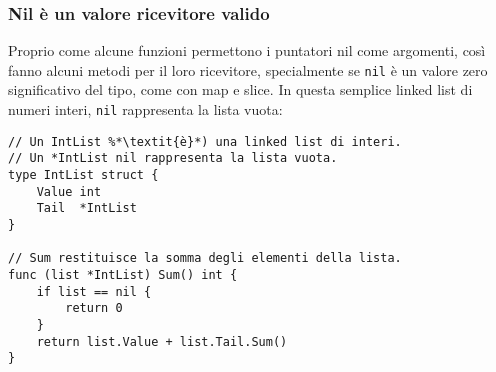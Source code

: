 \documentclass[../../thesis.tex]{subfiles}
\begin{document}
    \subsubsection{Nil è un valore ricevitore valido}
    Proprio come alcune funzioni permettono i puntatori nil come argomenti, così fanno alcuni metodi per il loro ricevitore, specialmente se \verb"nil" è un valore zero significativo del tipo, come con map e slice.
    In questa semplice linked list di numeri interi, \verb"nil" rappresenta la lista vuota:
    \begin{lstlisting}[frame = single, label = {lst:lstlisting5-2.8}]
// Un IntList %*\textit{è}*) una linked list di interi.
// Un *IntList nil rappresenta la lista vuota.
type IntList struct {
    Value int
    Tail  *IntList
}

// Sum restituisce la somma degli elementi della lista.
func (list *IntList) Sum() int {
    if list == nil {
        return 0
    }
    return list.Value + list.Tail.Sum()
}
    \end{lstlisting}
\end{document}
